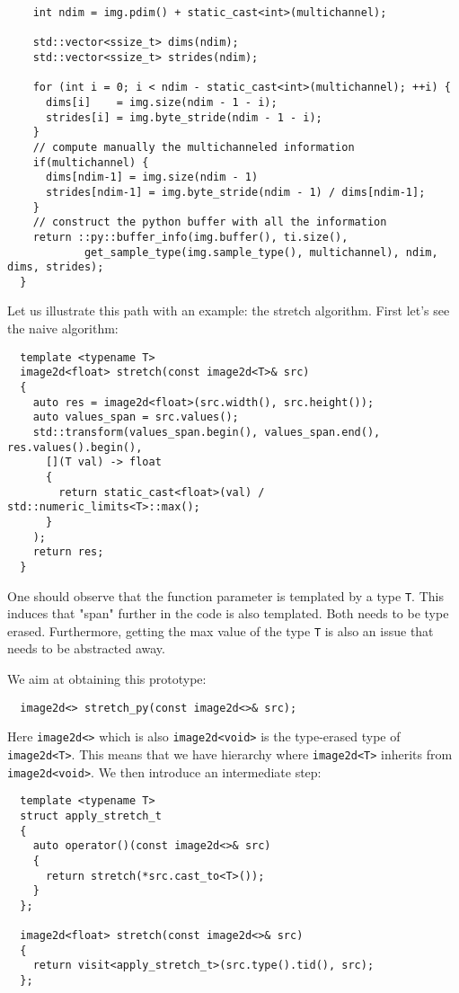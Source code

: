 \begin{verbatim}
    int ndim = img.pdim() + static_cast<int>(multichannel);

    std::vector<ssize_t> dims(ndim);
    std::vector<ssize_t> strides(ndim);

    for (int i = 0; i < ndim - static_cast<int>(multichannel); ++i) {
      dims[i]    = img.size(ndim - 1 - i);
      strides[i] = img.byte_stride(ndim - 1 - i);
    }
    // compute manually the multichanneled information
    if(multichannel) {
      dims[ndim-1] = img.size(ndim - 1)
      strides[ndim-1] = img.byte_stride(ndim - 1) / dims[ndim-1];
    }
    // construct the python buffer with all the information
    return ::py::buffer_info(img.buffer(), ti.size(),
            get_sample_type(img.sample_type(), multichannel), ndim, dims, strides);
  }
\end{verbatim}

\bigskip

Let us illustrate this path with an example: the stretch algorithm. First let's see the naive algorithm:
\begin{verbatim}
  template <typename T>
  image2d<float> stretch(const image2d<T>& src)
  {
    auto res = image2d<float>(src.width(), src.height());
    auto values_span = src.values();
    std::transform(values_span.begin(), values_span.end(), res.values().begin(),
      [](T val) -> float
      {
        return static_cast<float>(val) / std::numeric_limits<T>::max();
      }
    );
    return res;
  }
\end{verbatim}

One should observe that the function parameter is templated by a type \texttt{T}. This induces that "span" further in
the code is also templated. Both needs to be type erased. Furthermore, getting the max value of the type \texttt{T} is
also an issue that needs to be abstracted away.

We aim at obtaining this prototype:

\begin{verbatim}
  image2d<> stretch_py(const image2d<>& src);
\end{verbatim}

Here \texttt{image2d<>} which is also \texttt{image2d<void>} is the type-erased type of \texttt{image2d<T>}. This means
that we have hierarchy where \texttt{image2d<T>} inherits from \texttt{image2d<void>}. We then introduce an intermediate
step:

\begin{verbatim}
  template <typename T>
  struct apply_stretch_t
  {
    auto operator()(const image2d<>& src)
    {
      return stretch(*src.cast_to<T>());
    }
  };

  image2d<float> stretch(const image2d<>& src)
  {
    return visit<apply_stretch_t>(src.type().tid(), src);
  };
\end{verbatim}

